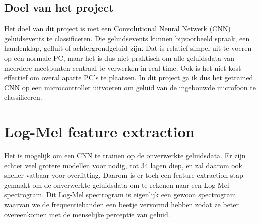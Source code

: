 \subsection{Doel van het project}

Het doel van dit project is met een Convolutional Neural Netwerk (CNN) geluidsevents te classificeren.
Die geluidsevents kunnen bijvoorbeeld spraak, een handenklap, gefluit of achtergrondgeluid zijn.
Dat is relatief simpel uit te voeren op een normale PC, maar het is dus niet praktisch om alle geluidsdata van meerdere meetpunten centraal te verwerken in real time.
Ook is het niet kost-effectief om overal aparte PC's te plaatsen. In dit project ga ik dus het getrained CNN op een microcontroller uitvoeren om geluid van de ingebouwde microfoon te classificeren.

\section{Log-Mel feature extraction}

Het is mogelijk om een CNN te trainen op de onverwerkte geluidsdata.
Er zijn echter veel grotere modellen voor nodig, tot 34 lagen diep, en zal daarom ook sneller vatbaar voor overfitting. \cite{IEEE:very-deep-cnn-raw-waveforms}
Daarom is er toch een feature extraction stap gemaakt om de onverwerkte geluidsdata om te rekenen naar een Log-Mel spectrogram.
Dit Log-Mel spectrogram is eigenlijk een gewoon spectrogram waarvan we de frequentiebanden een beetje vervormd hebben zodat ze beter overeenkomen met de menselijke perceptie van geluid. \cite{enwiki:mel-freq-cepstrum}

